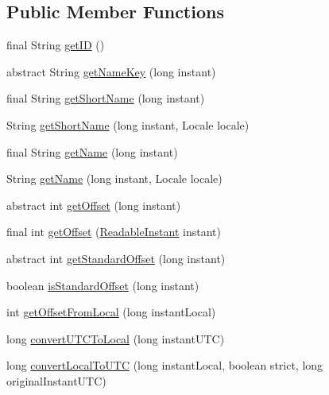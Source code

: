 \subsection*{Public Member Functions}
\begin{DoxyCompactItemize}
\item 
final String \hyperlink{classorg_1_1joda_1_1time_1_1_date_time_zone_a05f55d974998b5867c22133306c479e7}{get\-I\-D} ()
\item 
abstract String \hyperlink{classorg_1_1joda_1_1time_1_1_date_time_zone_ac519976d0eb06b2dc03e5f3ca1a61ea5}{get\-Name\-Key} (long instant)
\item 
final String \hyperlink{classorg_1_1joda_1_1time_1_1_date_time_zone_ab11c3da06857c4e6a6882e00eb55bfad}{get\-Short\-Name} (long instant)
\item 
String \hyperlink{classorg_1_1joda_1_1time_1_1_date_time_zone_aa8482b2e9eff673a23c3e223f75527c1}{get\-Short\-Name} (long instant, Locale locale)
\item 
final String \hyperlink{classorg_1_1joda_1_1time_1_1_date_time_zone_ab7e69188d0e2860909433769f9aa8b5f}{get\-Name} (long instant)
\item 
String \hyperlink{classorg_1_1joda_1_1time_1_1_date_time_zone_a9b00e7e5ba366a3127359a5308d182c8}{get\-Name} (long instant, Locale locale)
\item 
abstract int \hyperlink{classorg_1_1joda_1_1time_1_1_date_time_zone_a830444f420d1dede0e1f1db4c5222a8d}{get\-Offset} (long instant)
\item 
final int \hyperlink{classorg_1_1joda_1_1time_1_1_date_time_zone_aeca3aafd4a057e7d67657fea7289d312}{get\-Offset} (\hyperlink{interfaceorg_1_1joda_1_1time_1_1_readable_instant}{Readable\-Instant} instant)
\item 
abstract int \hyperlink{classorg_1_1joda_1_1time_1_1_date_time_zone_a431df3f6d98a6e5842a30afe738e584b}{get\-Standard\-Offset} (long instant)
\item 
boolean \hyperlink{classorg_1_1joda_1_1time_1_1_date_time_zone_a86c6acf723ff21b317fb6dc3ca902818}{is\-Standard\-Offset} (long instant)
\item 
int \hyperlink{classorg_1_1joda_1_1time_1_1_date_time_zone_a1dfe5b4ed9216350bca38fa93f6a17f2}{get\-Offset\-From\-Local} (long instant\-Local)
\item 
long \hyperlink{classorg_1_1joda_1_1time_1_1_date_time_zone_a5bd57e8becea83962a40f59fdb04cd25}{convert\-U\-T\-C\-To\-Local} (long instant\-U\-T\-C)
\item 
long \hyperlink{classorg_1_1joda_1_1time_1_1_date_time_zone_a05612a2f8597919e61af4d20156ff140}{convert\-Local\-To\-U\-T\-C} (long instant\-Local, boolean strict, long original\-Instant\-U\-T\-C)

\end{DoxyCompactItemize}
